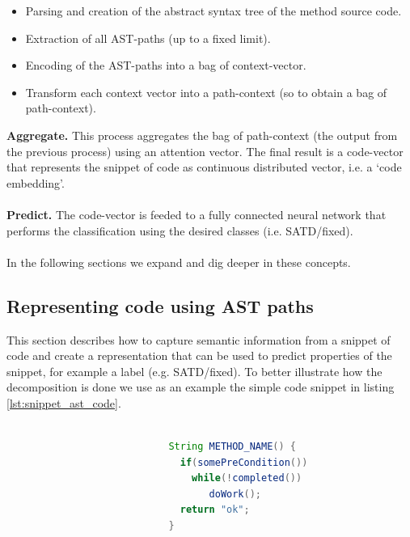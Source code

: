 \begin{itemize}
    \item Parsing and creation of the abstract syntax tree of the method source code. 
    \item Extraction of all AST-paths (up to a fixed limit).
    \item Encoding of the AST-paths into a bag of context-vector.
    \item Transform each context vector into a path-context (so to obtain a bag of path-context).
\end{itemize}

\noindent \textbf{Aggregate.} This process aggregates the bag of path-context (the output from the previous process) using an attention vector. The final result is a code-vector that represents the snippet of code as continuous distributed vector, i.e. a `code embedding'.
\\
\\
\noindent \textbf{Predict.} The code-vector is feeded to a fully connected neural network that performs the classification using the desired classes (i.e. SATD/fixed).
\\
\\
\noindent In the following sections we expand and dig deeper in these concepts.


\subsection{Representing code using AST paths}
This section describes how to capture semantic information from a snippet of code and create a representation that can be used to predict properties of the snippet, for example a label (e.g. SATD/fixed).
To better illustrate how the decomposition is done we use as an example the simple code snippet in listing \ref{lst:snippet_ast_code}.

\begin{lstlisting}[caption={Example code to show decomposition}, label={lst:snippet_ast_code},language=Java]

                            String METHOD_NAME() {
                              if(somePreCondition())
                                while(!completed())
                                   doWork();
                              return "ok";
                            }
                            
\end{lstlisting}

